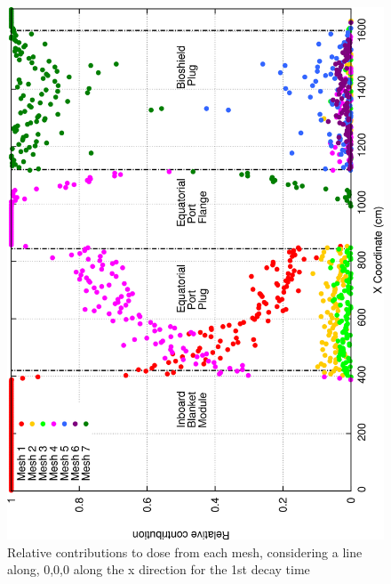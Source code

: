 \documentclass[12pt]{article}
\begin{document}
\begin{figure}[ht!]
\centering
\includegraphics[clip,scale=0.25]{../plots/crosstalk/b4c/ep/dc1_rel.png}
\caption{Relative contributions to dose from each mesh, considering a line along, 0,0,0 along the x direction for the 1st decay time}
\label{fig:b4c_ct_ep_dc1_rel}
\end{figure}
\end{document}
